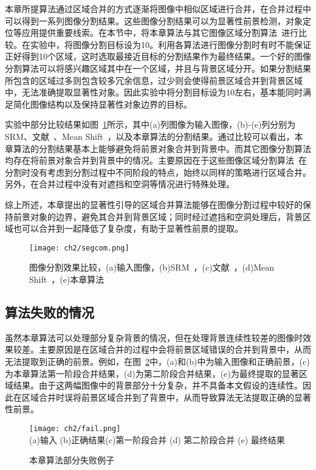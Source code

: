 本章所提算法通过区域合并的方式逐渐将图像中相似区域进行合并，在合并过程中可以得到一系列图像分割结果。这些图像分割结果可以为显著性前景检测，对象定位等应用提供重要线索。在本节中，将本章算法与其它图像区域分割算法~\cite{Richard2004Statistical,Xiao2015Complexity,MeanShift}进行比较。在实验中，将图像分割目标设为10。利用各算法进行图像分割时有时不能保证正好得到10个区域，这时选取最接近目标的分割结果作为最终结果。一个好的图像分割算法可以将感兴趣区域其中在一个区域，并且与背景区域分开。如果分割结果所包含的区域过多则包含较多冗余信息，过少则会使得前景区域合并到背景区域中，无法准确提取显著性对象。因此实验中将分割目标设为10左右，基本能同时满足简化图像结构以及保持显著性对象边界的目标。\par
实验中部分比较结果如图~\ref{fig:segCom}所示，其中(a)列图像为输入图像，(b)-(e)列分别为SRM、文献~、Mean Shift~\cite{MeanShift}，以及本章算法的分割结果。通过比较可以看出，本章算法的分割结果基本上能够避免将前景对象合并到背景中。而其它图像分割算法均存在将前景对象合并到背景中的情况。主要原因在于这些图像区域分割算法~\cite{Richard2004Statistical,Xiao2015Complexity,MeanShift}在分割时没有考虑到分割过程中不同阶段的特点，始终以同样的策略进行区域合并。另外，在合并过程中没有对遮挡和空洞等情况进行特殊处理。\par
综上所述，本章提出的显著性引导的区域合并算法能够在图像分割过程中较好的保持前景对象的边界，避免其合并到背景区域；同时经过遮挡和空洞处理后，背景区域也可以合并到一起降低了复杂度，有助于显著性前景的提取。
\begin{figure}[htb]
  \centering%
      {\texttt{[image: ch2/segcom.png]}}\\

  \caption{图像分割效果比较，(a)输入图像，(b)SRM~\cite{Richard2004Statistical}，(c)文献~，(d)Mean Shift~\cite{MeanShift}，(e)本章算法}
  \label{fig:segCom}
\end{figure}


\subsection{算法失败的情况}
\label{subsec:failure}

虽然本章算法可以处理部分复杂背景的情况，但在处理背景连续性较差的图像时效果较差。主要原因是在区域合并的过程中会将前景区域错误的合并到背景中，从而无法提取到正确的前景。例如，在图~\ref{fig:fail}中，(a)和(b)中为输入图像和正确前景，(c)为本章算法第一阶段合并结果，(d)为第二阶段合并结果，(e)为最终提取的显著区域结果。由于这两幅图像中的背景部分十分复杂，并不具备本文假设的连续性。因此在区域合并时误将前景区域合并到了背景中，从而导致算法无法提取正确的显著性前景。
 \begin{figure}[htb]
  \centering%
      {\texttt{[image: ch2/fail.png]}}\\
(a)输入 \quad\quad \quad(b)正确结果(c)第一阶段合并 (d) 第二阶段合并 (e) 最终结果\\
  \caption{本章算法部分失败例子}
  \label{fig:fail}
\end{figure}



